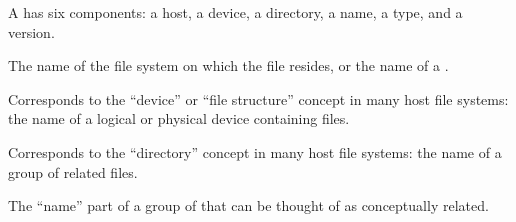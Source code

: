 

%

A  has six components:
     a host,
     a device,
     a directory,
     a name,
     a type,
 and a version.



The name of the file system on which the file resides,
or the name of a .


\endsubsubsection%


Corresponds to the ``device'' or ``file structure'' concept in many
host file systems: the name of a logical or physical device containing files.


\endsubsubsection%


Corresponds to the ``directory'' concept in many host file systems:
the name of a group of related files.


\endsubsubsection%


The ``name'' part of a group of  that can be thought of
as conceptually related.

